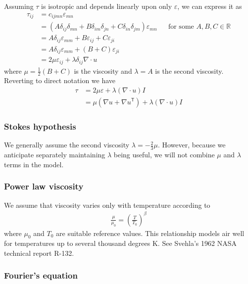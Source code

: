 \documentclass[letterpaper,11pt,nointlimits,reqno]{amsart}
\newcommand{\trans}[1]{{#1}^{\ensuremath{\mathsf{T}}}}
\begin{document}
Assuming $\tau$ is isotropic and depends linearly upon only $\varepsilon$,
we can express it as
\begin{align}
\tau_{ij} 
  &= c_{ijmn} \varepsilon_{mn}
  \\
  &= \left( A \delta_{ij} \delta_{mn} 
          + B \delta_{im} \delta_{jn} 
          + C \delta_{in} \delta_{jm}
     \right) \varepsilon_{mn}
  &
  &\text{for some }A, B, C\in\mathbb{R}
  \\
  &= A \delta_{ij} \varepsilon_{mm} + B\varepsilon_{ij} + C\varepsilon_{ji}
  \\
  &= A \delta_{ij} \varepsilon_{mm} + \left( B+C \right)\varepsilon_{ji}
  \\
  &= 2 \mu \varepsilon_{ij} + \lambda\delta_{ij}\nabla\cdot{}u
\end{align}
where $\mu=\frac{1}{2}\left( B + C \right)$ is the viscosity
and $\lambda=A$ is the second viscosity.
Reverting to direct notation we have
\begin{align}
\tau 
  &= 2 \mu \varepsilon + \lambda \left( \nabla\cdot{}u \right) I
  \\
\label{eq:taunewt}
&=   \mu \left( \nabla{}u + \trans{\nabla{}u} \right) 
   + \lambda \left( \nabla\cdot{}u \right) I
\end{align}

\subsubsection{Stokes hypothesis}

We generally assume the second viscosity $\lambda=-\frac{2}{3}\mu$.
However, because we anticipate separately maintaining $\lambda$ being
useful, we will not combine $\mu$ and $\lambda$ terms in the model.

\subsubsection{Power law viscosity}

We assume that viscosity varies only with temperature according to
\begin{align}
  \label{eq:powerlawviscosity}
  \frac{\mu}{\mu_{0}}=\left(\frac{T}{T_{0}}\right)^{\beta}
\end{align}
where $\mu_{0}$ and $T_{0}$ are suitable reference values.  This
relationship models air well for temperatures up to several thousand
degrees K.  See Svehla's 1962 NASA technical report R-132.

\subsubsection{Fourier's equation}
\end{document}
